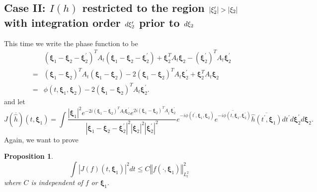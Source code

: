 \documentclass[reqno]{amsart}
\theoremstyle{plain}
\newtheorem{proposition}{Proposition}
\numberwithin{equation}{section}
\begin{document}
\subsection{Case II: $I(h)$ restricted to the region $\left\vert \mathbf{\protect\xi }_{2}^{\prime }\right\vert >\left\vert \mathbf{\protect\xi }_{2}\right\vert $ with integration order $d\mathbf{\protect\xi }_{2}^{\prime
}$ prior to $d\mathbf{\protect\xi }_{2}$}

This time we write the phase function to be\begin{eqnarray*}
&&\left( \mathbf{\xi }_{1}-\mathbf{\xi }_{2}-\mathbf{\xi }_{2}^{\prime
}\right) ^{T}A_{t}\left( \mathbf{\xi }_{1}-\mathbf{\xi }_{2}-\mathbf{\xi }_{2}^{\prime }\right) +\mathbf{\xi }_{2}^{T}A_{t}\mathbf{\xi }_{2}-\left( 
\mathbf{\xi }_{2}^{\prime }\right) ^{T}A_{t}\mathbf{\xi }_{2}^{\prime } \\
&=&\left( \mathbf{\xi }_{1}-\mathbf{\xi }_{2}\right) ^{T}A_{t}\left( \mathbf{\xi }_{1}-\mathbf{\xi }_{2}\right) -2\left( \mathbf{\xi }_{1}-\mathbf{\xi }_{2}\right) ^{T}A_{t}\mathbf{\xi }_{2}^{\prime }+\mathbf{\xi }_{2}^{T}A_{t}\mathbf{\xi }_{2} \\
&=&\phi (t,\mathbf{\xi }_{1},\mathbf{\xi }_{2})-2\left( \mathbf{\xi }_{1}-\mathbf{\xi }_{2}\right) ^{T}A_{t}\mathbf{\xi }_{2}^{\prime }.
\end{eqnarray*}and let\begin{equation*}
J\left( \overline{\hat{h}}\right) (t,\mathbf{\xi }_{1})=\int \frac{\left\vert \mathbf{\xi }_{1}\right\vert ^{2}e^{-2i\left( \mathbf{\xi }_{1}-\mathbf{\xi }_{2}\right) ^{T}A_{t}\mathbf{\xi }_{2}^{\prime }}e^{2i\left( 
\mathbf{\xi }_{1}-\mathbf{\xi }_{2}\right) ^{T}A_{t^{\prime }}\mathbf{\xi }_{2}^{\prime }}}{\left\vert \mathbf{\xi }_{1}-\mathbf{\xi }_{2}-\mathbf{\xi }_{2}^{\prime }\right\vert ^{2}\left\vert \mathbf{\xi }_{2}\right\vert
^{2}\left\vert \mathbf{\xi }_{2}^{\prime }\right\vert ^{2}}e^{-i\phi
(t^{\prime },\mathbf{\xi }_{1},\mathbf{\xi }_{2})}\overline{e^{-i\phi (t,\mathbf{\xi }_{1},\mathbf{\xi }_{2}^{\prime })}}\overline{\hat{h}(t^{\prime
},\mathbf{\xi }_{1})}dt^{\prime }d\mathbf{\xi }_{2}^{\prime }d\mathbf{\xi }_{2}.
\end{equation*}Again, we want to prove

\begin{proposition}
\begin{equation*}
\int \left\vert J(f)(t,\mathbf{\xi }_{1})\right\vert ^{2}dt\leqslant
C\left\Vert f(\cdot ,\mathbf{\xi }_{1})\right\Vert _{L_{t}^{2}}^{2}
\end{equation*}where $C$ is independent of $f$ or $\mathbf{\xi }_{1}.$
\end{proposition}
\end{document}
